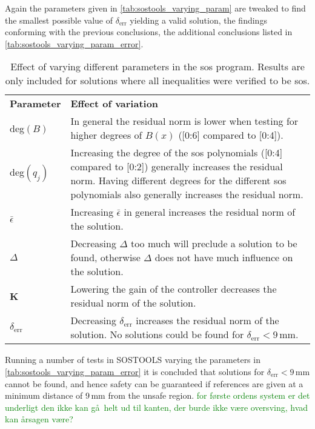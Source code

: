 Again the parameters given in \autoref{tab:sostools_varying_param} are tweaked to find the smallest possible value of $\delta_\text{err}$ yielding a valid solution, the findings conforming with the previous conclusions, the additional conclusions listed in \autoref{tab:sostools_varying_param_error}.

\begin{table}[htbp]
\begin{tabularx}{\textwidth}{l X}
\rowcolor{HeaderBlue}
\textbf{Parameter} & \textbf{Effect of variation}\\
deg$(B)$ & In general the residual norm is lower when testing for higher degrees of $B(x)$ ([0:6] compared to [0:4]).\\
\rowcolor{textBlue}
deg$(q_j)$ & Increasing the degree of the \gls{sos} polynomials ([0:4] compared to [0:2]) generally increases the residual norm. Having different degrees for the different \gls{sos} polynomials also generally increases the residual norm.\\
$\bar{\epsilon}$ & Increasing $\bar{\epsilon}$ in general increases the residual norm of the solution. \\
\rowcolor{textBlue}
$\Delta$ & Decreasing $\Delta$ too much will preclude a solution to be found, otherwise $\Delta$ does not have much influence on the solution.\\
\textbf{K} & Lowering the gain of the controller decreases the residual norm of the solution.\\
\rowcolor{textBlue}
$\delta_\text{err}$ & Decreasing $\delta_\text{err}$ increases the residual norm of the solution. No solutions could be found for $\delta_\text{err}<9$\,mm.
\end{tabularx}
\caption{Effect of varying different parameters in the \gls{sos} program. Results are only included for solutions where all inequalities were verified to be \gls{sos}.}
\label{tab:sostools_varying_param_error}
\end{table}



Running a number of tests in SOSTOOLS varying the parameters in \autoref{tab:sostools_varying_param_error} it is concluded that solutions for $\delta_\text{err}<9$\,mm cannot be found, and hence safety can be guaranteed if references are given at a minimum distance of 9\,mm from the unsafe region. \textcolor{green}{for f\o rste ordens system er det underligt den ikke kan g\aa\, helt ud til kanten, der burde ikke v\ae re oversving, hvad kan \aa rsagen v\ae re?}

